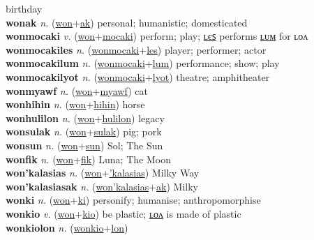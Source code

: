 birthday \label{wonestakisunkwelwel} \\
\textbf{wonak} \textit{n.} (\hyperref[won]{won}+\hyperref[ak]{ak})
personal; humanistic; domesticated \label{wonak} \\
\textbf{wonmocaki} \textit{v.} (\hyperref[won]{won}+\hyperref[mocaki]{mocaki})
perform; play; \hyperref[wonmocakiles]{ʟєꜱ} performs \hyperref[wonmocakilum]{ʟᴜᴍ} for ʟᴏᴧ \label{wonmocaki} \\
\textbf{wonmocakiles} \textit{n.} (\hyperref[wonmocaki]{wonmocaki}+\hyperref[les]{les})
player; performer; actor \label{wonmocakiles} \\
\textbf{wonmocakilum} \textit{n.} (\hyperref[wonmocaki]{wonmocaki}+\hyperref[lum]{lum})
performance; show; play \label{wonmocakilum} \\
\textbf{wonmocakilyot} \textit{n.} (\hyperref[wonmocaki]{wonmocaki}+\hyperref[lyot]{lyot})
theatre; amphitheater \label{wonmocakilyot} \\
\textbf{wonmyawf} \textit{n.} (\hyperref[won]{won}+\hyperref[myawf]{myawf})
cat \label{wonmyawf} \\
\textbf{wonhihin} \textit{n.} (\hyperref[won]{won}+\hyperref[hihin]{hihin})
horse \label{wonhihin} \\
\textbf{wonhulilon} \textit{n.} (\hyperref[won]{won}+\hyperref[hulilon]{hulilon})
legacy \label{wonhulilon} \\
\textbf{wonsulak} \textit{n.} (\hyperref[won]{won}+\hyperref[sulak]{sulak})
pig; pork \label{wonsulak} \\
\textbf{wonsun} \textit{n.} (\hyperref[won]{won}+\hyperref[sun]{sun})
Sol; The Sun \label{wonsun} \\
\textbf{wonfik} \textit{n.} (\hyperref[won]{won}+\hyperref[fik]{fik})
Luna; The Moon \label{wonfik} \\
\textbf{won'kalasias} \textit{n.} (\hyperref[won]{won}+\hyperref['kalasias]{'kalasias})
Milky Way \label{won'kalasias} \\
\textbf{won'kalasiasak} \textit{n.} (\hyperref[won'kalasias]{won'kalasias}+\hyperref[ak]{ak})
Milky \label{won'kalasiasak} \\
\textbf{wonki} \textit{n.} (\hyperref[won]{won}+\hyperref[ki]{ki})
personify; humanise; anthropomorphise \label{wonki} \\
\textbf{wonkio} \textit{v.} (\hyperref[won]{won}+\hyperref[kio]{kio})
be plastic; \hyperref[wonkiolon]{ʟᴏᴧ} is made of plastic \label{wonkio} \\
\textbf{wonkiolon} \textit{n.} (\hyperref[wonkio]{wonkio}+\hyperref[lon]{lon})
